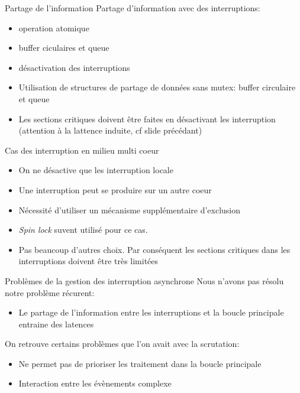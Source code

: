 \begin{frame}{Partage de l'information}
  Partage d'information avec des interruptions:
  \begin{itemize} 
  \item  operation atomique
  \item  buffer ciculaires et queue
  \item  désactivation des interruptions
  \end{itemize} 
  \begin{itemize} 
  \item Utilisation  de structures de  partage de données  sans mutex:
    buffer circulaire et queue
  \item Les sections critiques  doivent être faites en désactivant les
    interruption (attention à la lattence induite, cf slide précédant)
  \end{itemize} 
\end{frame} 

\begin{frame}{Cas des interruption en milieu multi coeur}
  \begin{itemize} 
  \item On ne désactive que les interruption locale
  \item Une interruption peut se produire sur un autre coeur
  \item Nécessité d'utiliser un mécanisme supplémentaire d'exclusion
  \item \emph{Spin lock} suvent utilisé pour ce cas.
  \item  Pas beaucoup  d'autres  choix.  Par  conséquent les  sections
    critiques dans les interruptions doivent être très limitées
  \end{itemize} 
\end{frame} 

\begin{frame}{Problèmes de la gestion des interruption asynchrone}
  Nous n'avons pas résolu notre problème récurent:
  \begin{itemize} 
  \item  Le partage  de l'information  entre les  interruptions  et la
    boucle principale entraine des latences
  \end{itemize} 
  On retrouve certains problèmes que l'on avait avec la scrutation:
  \begin{itemize} 
  \item  Ne permet  pas de  prioriser  les traitement  dans la  boucle
    principale
  \item Interaction entre les évènements complexe
  \end{itemize} 
\end{frame} 


